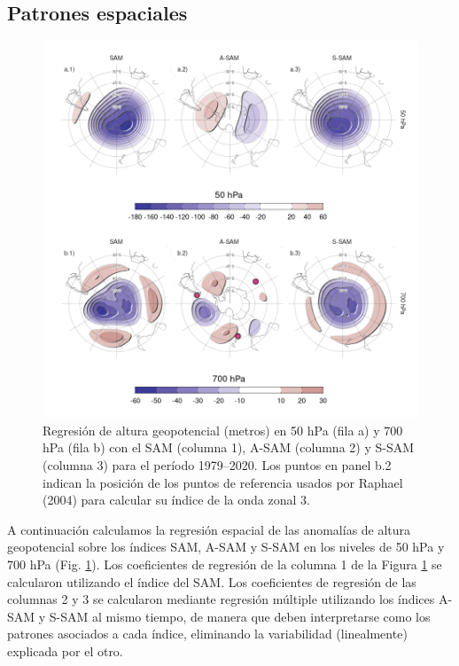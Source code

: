 \documentclass[12pt,oneside,a4paper]{reedthesis}
\begin{document}
\hypertarget{spatial}{%
\subsection{Patrones espaciales}\label{spatial}}



\begin{figure}

{\centering \includegraphics{figures/30-sam/2d-regr-1} 

}

\caption{Regresión de altura geopotencial (metros) en 50 hPa (fila a) y 700 hPa (fila b) con el SAM (columna 1), A-SAM (columna 2) y S-SAM (columna 3) para el período 1979--2020. Los puntos en panel b.2 indican la posición de los puntos de referencia usados por Raphael (2004) para calcular su índice de la onda zonal 3.}\label{fig:2d-regr}
\end{figure}

A continuación calculamos la regresión espacial de las anomalías de altura geopotencial sobre los índices SAM, A-SAM y S-SAM en los niveles de 50 hPa y 700 hPa (Fig. \ref{fig:2d-regr}).
Los coeficientes de regresión de la columna 1 de la Figura \ref{fig:2d-regr} se calcularon utilizando el índice del SAM.
Los coeficientes de regresión de las columnas 2 y 3 se calcularon mediante regresión múltiple utilizando los índices A-SAM y S-SAM al mismo tiempo, de manera que deben interpretarse como los patrones asociados a cada índice, eliminando la variabilidad (linealmente) explicada por el otro.
\end{document}
